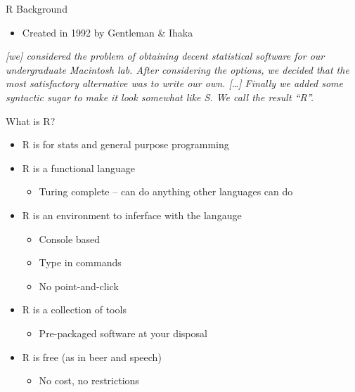 \documentclass[ignorenonframetext,]{beamer}
\providecommand{\tightlist}{%
  \setlength{\itemsep}{0pt}\setlength{\parskip}{0pt}}
\begin{document}
\begin{frame}{R Background}
\protect\hypertarget{r-background}{}

\begin{itemize}
\tightlist
\item
  Created in 1992 by Gentleman \& Ihaka
\end{itemize}

\emph{{[}we{]} considered the problem of obtaining decent statistical
software for our undergraduate Macintosh lab. After considering the
options, we decided that the most satisfactory alternative was to write
our own. {[}\ldots{}{]} Finally we added some syntactic sugar to make it
look somewhat like S. We call the result ``R''.}

\end{frame}

\begin{frame}{What is R?}
\protect\hypertarget{what-is-r}{}

\begin{itemize}
\tightlist
\item
  R is for stats and general purpose programming
\item
  R is a functional language

  \begin{itemize}
  \tightlist
  \item
    Turing complete -- can do anything other languages can do
  \end{itemize}
\item
  R is an environment to inferface with the langauge

  \begin{itemize}
  \tightlist
  \item
    Console based
  \item
    Type in commands
  \item
    No point-and-click
  \end{itemize}
\item
  R is a collection of tools

  \begin{itemize}
  \tightlist
  \item
    Pre-packaged software at your disposal
  \end{itemize}
\item
  R is free (as in beer and speech)

  \begin{itemize}
  \tightlist
  \item
    No cost, no restrictions
  \end{itemize}
\end{itemize}

\end{frame}
\end{document}
